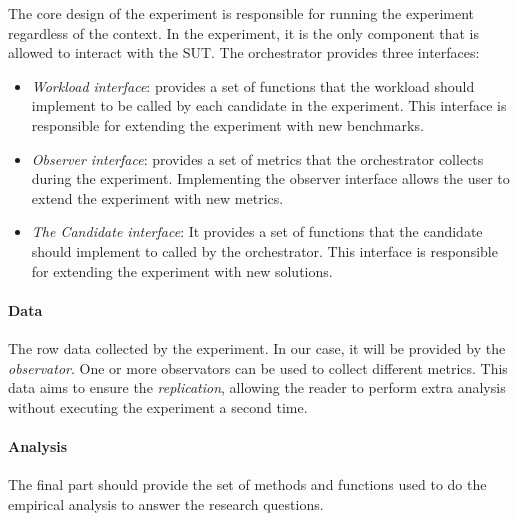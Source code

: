 The core design of the experiment is responsible for running the experiment regardless of the context.
In the experiment, it is the only component that is allowed to interact with the SUT.
The orchestrator provides three interfaces:
\begin{itemize}
    \item \emph{Workload interface}: provides a set of functions that the workload should implement to be called by each candidate in the experiment. This interface is responsible for extending the experiment with new benchmarks.
    \item \emph{Observer interface}: provides a set of metrics that the orchestrator collects during the experiment. Implementing the observer interface allows the user to extend the experiment with new metrics.
    \item \emph{The Candidate interface}: It provides a set of functions that the candidate should implement to called  by the orchestrator. This interface is responsible for extending the experiment with new solutions.
\end{itemize}

\paragraph{Data}
The row data collected by the experiment. In our case, it will be provided by the \emph{observator}. One or more observators can be used to collect different metrics. This data aims to ensure the \emph{replication}, allowing the reader to perform extra analysis without executing the experiment a second time.


\paragraph{Analysis}
The final part should provide the set of methods and functions used to do the empirical analysis to answer the research questions.













